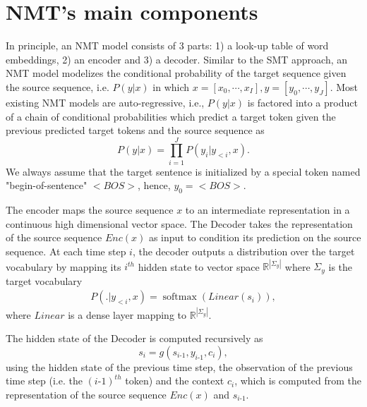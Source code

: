 \section{NMT's main components}
In principle, an NMT model consists of 3 parts: 1) a look-up table of word embeddings, 2) an encoder and 3) a decoder. Similar to the SMT approach, an NMT model modelizes the conditional probability of the target sequence given the source sequence, i.e. $P(y|x)$ in which $x=[x_0,\cdots,x_{I}], y=[y_0,\cdots,y_{J}]$. Most existing NMT models are auto-regressive, i.e., $P(y|x)$ is factored into a product of a chain of conditional probabilities which predict a target token given the previous predicted target tokens and the source sequence as
\begin{equation}
P(y|x) = \displaystyle{\mathop{\prod}_{i=1}^{J}} P(y_i|y_{<i},x).
\label{eq:factorization-chap2}
\end{equation}
We always assume that the target sentence is initialized by a special token named "begin-of-sentence" $<BOS>$, hence, $y_{0}=<BOS>$. 

The encoder maps the source sequence $x$ to an intermediate representation in a continuous high dimensional vector space. The Decoder takes the representation of the source sequence $Enc(x)$ as input to condition its prediction on the source sequence. At each time step $i$, the decoder outputs a distribution over the target vocabulary by mapping its $i^{th}$ hidden state to vector space $\mathbb{R}^{|\Sigma_y|}$ where $\Sigma_y$ is the target vocabulary
\begin{equation}
\begin{array}{rcl}
P(.|y_{<i},x) = \operatorname{softmax}(Linear(s_i)),
\end{array}
\end{equation}
where $Linear$ is a dense layer mapping to $\mathbb{R}^{|\Sigma_y|}$.

The hidden state of the Decoder is computed recursively as 
\begin{equation}
s_i = g(s_{i\text{-}1},y_{i\text{-}1},c_i),
\end{equation}
using the hidden state of the previous time step, the observation of the previous time step (i.e. the $(i\text{-}1)^{th}$ token) and the context $c_i$, which is computed from the representation of the source sequence $Enc(x)$ and $s_{i\text{-}1}$.

